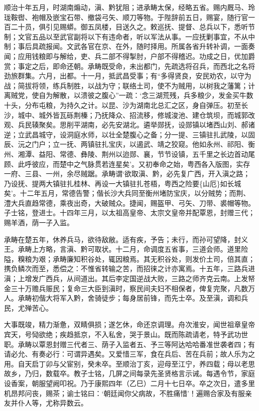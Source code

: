 \documentclass[]{article}
\begin{document}
顺治十年五月，时湖南煽动，滇、黔犹阻；进承畴太保，经略五省。赐内厩马、玲珑鞍辔、袍帽及嵌宝石带、撤袋弓矢、顺刀等物。于陛辞前五日，赐宴，随行官一百二十员，俱引见赐蟒。御五凤楼，目送久之。敕巡抚、提督、总兵以下，悉听节制；文官五品以至武官副将以下有违命者，听以军法从事。一应抚剿事宜，不从中制；事后具疏报闻。文武各官在京、在外，随时择用。所属各省升转补调，一面奏闻；应用钱粮即与解给，吏、兵二部不得掣肘，户部不得稽迟。功成之日，优加爵赏；事定之后，即命还朝。承畴既受命，未出都门，先疏选将召兵，而西北之名将劲旅群集。六月，出都。十一月，抵武昌受事；有``多得贤良，安民劝农，以守为战；简拔将领，练兵制胜，以战为守；联络土司，使不为贼用，以树我之藩篱；计离贼党，使自为解散，以溃彼之腹心''一疏：`念三湖荒残，兵多粮少，发金买牛数十头，分布屯粮，为持久之计。以昆、沙为湖南北总汇之区，身自弹压。初至长沙，城中、城外皆瓦砾荆榛；乃抚降众、招流移，修城浚池、建仓筑坝，而城郭改观、兵民辏聚矣。思削平湖南，必先安湖北。遴举郧抚，设郧镇以堵西山刘、郝诸逆；立武昌城守，设洞庭水师，以壮全楚腹心之备；分一提、三镇驻扎武陵，以固辰、沅之门户；立一抚、两镇驻扎宝庆，以遏武、靖之狡窥。他如永州、祁阳、衡州、湘潭、益阳、常德、彝陵、荆州以迨郧、襄，节节设镇，五千里之长边首动尾顾、此呼彼应，而楚中之气脉贯若连星矣'。又初奉命之始，粤西各入版图，实存一府、三县、一州，余尽贼踞。承畴谓`欲取滇、黔，必先复广西，开入滇之路；乃设抚、提两大镇驻扎桂林、再设一大镇驻扎苍梧，粤西之险要\{山厄\}如长城矣'。十二年五月，常德告警；偕长沙大兵同至衡州堵防宝庆，以分贼势；而荆、澧大兵直趋常德，乘夜出奇，大破贼众。捷闻，赐盔甲、弓矢、刀带、裘帽等物。子士铭，登进士。十四年三月，以太祖高皇帝、太宗文皇帝并配覃恩，封赠三代；赐羊酒，荫一子入监。

承畴在楚五年，休养兵马，欲待敌敝。适有疾，予告；未行，而孙可望降，封义王。承畴上方略，言滇、黔可取状。十二月，命调度五省事，三道会师。道里险隘，糗粮为艰；承畴廉知积谷处，辄因粮焉。其无积谷处，则发价土司，倍其直；携负鳞次而至，悉偿之：不惟省转输之苦，而招徕之计亦寓焉。十五年，三路兵进滇；上增发广西兵，从间道出。其后李定国逆战大败，三路之师齐克云南。上发帑金三十万赡兵赈民；复命三大臣到滇时，察民间夫妇不相保者，俾复完聚，凡数万人。承畴初偕大将军入黔，舍骑徒步；每身居前锋，而先士卒。及至滇，调和兵民，尤殚苦心。

大事既竣，精力渐惫，双睛俱损；遂乞休，命还京调理。舟次淮安，闻世祖章皇帝宾天，号恸欲绝；疾趋抵京，不入私舍，哭于景山。既而陈疏请老，特予武功世职。承畴以覃恩封赠三代者三、荫子入监者五、予三等阿达哈哈番准世袭者四；有请必允、有奏必行：可谓异遇矣。又爱惜三军，食在兵后、苦在兵前；故人乐为之用。自天启丁卯与父宦别，癸未卒。至顺治丁亥，迎母至江宁，养四载；母以老思故乡，乃归，数载卒。教子士铭，几屏之间每录先圣贤格言示诫。每遇令节，家庭设香案，朝服望阙叩祝。乃于康熙四年（乙巳）二月十七日卒。卒之次日，遣多里机昂邦问丧，赐茶；谕士铭曰：`朝廷闻你父病故，不胜痛惜'！遍赐合家及有服亲友并仆人等，尤称异数云。
\end{document}
